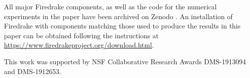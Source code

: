 \documentclass[format=acmsmall,screen,timestamp=false,a4paper]{acmart}
\newcommand\josh[1]{\textbf{\textcolor[rgb]{0,.5,1}{[Josh: #1]}}}
\begin{document}
All major Firedrake components, as well as the code for the numerical experiments in the paper have been archived on Zenodo \cite{zenodo/2021}. An installation of Firedrake with components matching those used to produce the results in this paper can be obtained following the instructions at \url{https://www.firedrakeproject.org/download.html}.

\begin{acks}
This work was supported by NSF Collaborative Research Awards DMS-1913094 and DMS-1912653.
    
  
\end{acks}



    

\end{document}
